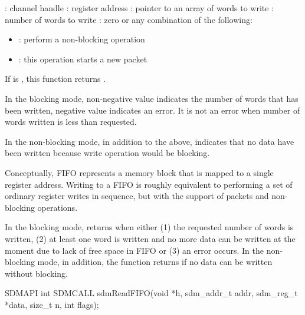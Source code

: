 \documentclass[a4paper,12pt,twoside,extrafontsizes]{memoir}
\begin{document}
\begin{funcparams}
	: channel handle
	: register address
	: pointer to an array of words to write
	: number of words to write
	: zero or any combination of the following:
		\begin{itemize}
			\item{}: perform a non-blocking operation
			\item{}: this operation starts a new packet
		\end{itemize}
\end{funcparams}

\begin{funcret}
	If  is , this function returns .
	
	In the blocking mode, non-negative value indicates the number of words that has been written, negative value indicates an error. It is not an error when number of words written is less than requested.
	
	In the non-blocking mode, in addition to the above,  indicates that no data have been written because write operation would be blocking.
\end{funcret}

\begin{funcremarks}
	Conceptually, FIFO represents a memory block that is mapped to a single register address. Writing to a FIFO is roughly equivalent to performing a set of ordinary register writes in sequence, but with the support of packets and non-blocking operations.
	
	In the blocking mode,  returns when either (1) the requested number of words is written, (2) at least one word is written and no more data can be written at the moment due to lack of free space in FIFO or (3) an error occurs. In the non-blocking mode, in addition, the function returns if no data can be written without blocking.
\end{funcremarks}



\begin{cfuncprototype}
SDMAPI int SDMCALL sdmReadFIFO(void *h, sdm_addr_t addr, sdm_reg_t *data, size_t n, int flags);
\end{cfuncprototype}
\end{document}
